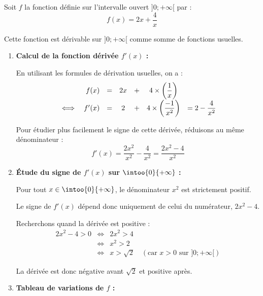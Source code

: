 \begin{ex}
	Soit $f$ la fonction définie sur l'intervalle ouvert $]0; +\infty[$ par :
				\[
					f(x) = 2x + \frac{4}{x}
				\]

				Cette fonction est dérivable sur $]0; +\infty[$ comme somme de fonctions usuelles.

	\begin{enumerate}
		\item \textbf{Calcul de la fonction dérivée $f'(x)$ :}

		      En utilisant les formules de dérivation usuelles, on a :
		      \[
			      \def\arraystretch{1.8}
			      \begin{array}{rrccccl}
				           & f(x)  & = & 2x & + & 4 \times \left(\dfrac{1}{x}\right)    &                      \\
				      \iff & f'(x) & = & 2  & + & 4 \times \left(\dfrac{-1}{x^2}\right) & = 2 - \dfrac{4}{x^2}
			      \end{array}
		      \]

		      Pour étudier plus facilement le signe de cette dérivée, réduisons au même dénominateur :
		      \[
			      f'(x) = \frac{2x^2}{x^2} - \frac{4}{x^2} = \frac{2x^2 - 4}{x^2}
		      \]

		\item \textbf{Étude du signe de $f'(x)$ sur $\intoo{0}{+\infty}$ :}

		      Pour tout $x \in \intoo{0}{+\infty}$, le dénominateur $x^2$ est strictement positif.

		      Le signe de $f'(x)$ dépend donc uniquement de celui du numérateur, $2x^2 - 4$.

		      Recherchons quand la dérivée est positive :
		      \[
			      \begin{array}{rcl}
				      2x^2 - 4 > 0 & \iff & 2x^2 > 4                                                         \\
				                   & \iff & x^2 > 2                                                          \\
				                   & \iff & x > \sqrt{2} \quad (\text{car } x > 0 \text{ sur } ]0; +\infty[)
			      \end{array}
		      \]

		      La dérivée est donc négative avant $\sqrt{2}$ et positive après.

		\item \textbf{Tableau de variations de $f$ :}


\end{enumerate}
\end{ex}
